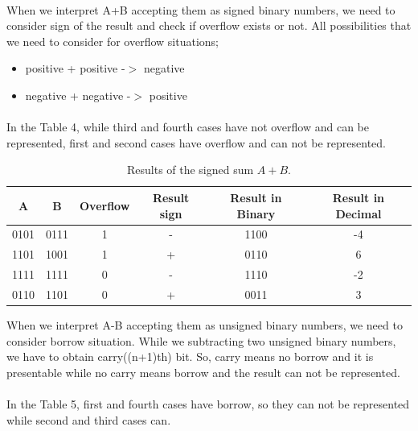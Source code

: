 \documentclass[pdftex,12pt,a4paper]{article}
\begin{document}
\paragraph{}
When we interpret A+B accepting them as signed binary numbers, we need to consider sign of the result and check if overflow exists or not. All possibilities that we need to consider for overflow situations;
\begin{itemize}
    \item positive + positive -$>$ negative
    \item negative + negative -$>$ positive 
\end{itemize}

\paragraph{}
In the Table 4, while third and fourth cases have not overflow and can be represented, first and second cases have overflow and can not be represented. \newline

\begin{table}[!h]
\begin{center}
    \begin{tabular}{|c|c|c|c|c|c|}
    \hline
         A & B & Overflow & Result sign & Result in Binary & Result in Decimal \\
         \hline
         0101 & 0111 & 1 & - & 1100 & -4 \\
         \hline
         1101 & 1001 & 1 & + & 0110 & 6 \\
         \hline
         1111 & 1111 & 0 & - & 1110 & -2 \\
         \hline
         0110 & 1101 & 0 & + & 0011 & 3 \\
         \hline
        \end{tabular}
    \caption{Results of the signed sum $A + B$.}
    \label{signed_sum}
\end{center}
\end{table}
\clearpage

When we interpret A-B accepting them as unsigned binary numbers, we need to consider borrow situation. While we subtracting two unsigned binary numbers, we have to obtain carry((n+1)th) bit. So, carry means no borrow and it is presentable while no carry means borrow and the result can not be represented.
\paragraph{}
In the Table 5, first and fourth cases have borrow, so they can not be represented while second and third cases can.\newline
\end{document}
